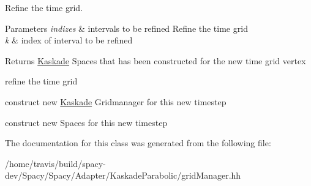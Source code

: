 Refine the time grid. 


\begin{DoxyParams}{Parameters}
{\em indizes} & intervals to be refined Refine the time grid \\
\hline
{\em k} & index of interval to be refined \\
\hline
\end{DoxyParams}
\begin{DoxyReturn}{Returns}
\hyperlink{namespaceSpacy_1_1Kaskade}{Kaskade} Spaces that has been constructed for the new time grid vertex 
\end{DoxyReturn}
refine the time grid

construct new \hyperlink{namespaceSpacy_1_1Kaskade}{Kaskade} Gridmanager for this new timestep

construct new Spaces for this new timestep 

The documentation for this class was generated from the following file\-:\begin{DoxyCompactItemize}
\item 
/home/travis/build/spacy-\/dev/\-Spacy/\-Spacy/\-Adapter/\-Kaskade\-Parabolic/grid\-Manager.\-hh\end{DoxyCompactItemize}
